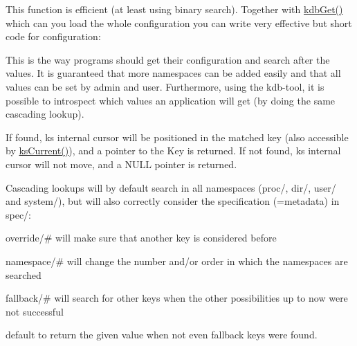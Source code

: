 This function is efficient (at least using binary search). Together with \mbox{\hyperlink{group__kdb_ga28e385fd9cb7ccfe0b2f1ed2f62453a1}{kdb\+Get()}} which can you load the whole configuration you can write very effective but short code for configuration\+:


\begin{DoxyCodeInclude}{0}
\end{DoxyCodeInclude}
 This is the way programs should get their configuration and search after the values. It is guaranteed that more namespaces can be added easily and that all values can be set by admin and user. Furthermore, using the kdb-\/tool, it is possible to introspect which values an application will get (by doing the same cascading lookup).

If found, {\ttfamily ks} internal cursor will be positioned in the matched key (also accessible by \mbox{\hyperlink{group__keyset_ga4287b9416912c5f2ab9c195cb74fb094}{ks\+Current()}}), and a pointer to the Key is returned. If not found, {\ttfamily ks} internal cursor will not move, and a N\+U\+LL pointer is returned.

Cascading lookups will by default search in all namespaces (proc/, dir/, user/ and system/), but will also correctly consider the specification (=metadata) in spec/\+:


\begin{DoxyItemize}
\item {\ttfamily override/\#} will make sure that another key is considered before
\item {\ttfamily namespace/\#} will change the number and/or order in which the namespaces are searched
\item {\ttfamily fallback/\#} will search for other keys when the other possibilities up to now were not successful
\item {\ttfamily default} to return the given value when not even {\ttfamily fallback} keys were found.
\end{DoxyItemize}

